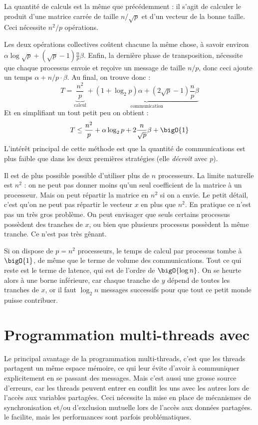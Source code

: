La quantité de calculs est la même que précédemment : il s'agit de calculer le
produit d'une matrice carrée de taille $n/\sqrt{p}$ et d'un vecteur de la bonne
taille. Ceci nécessite $n^2/p$ opérations.

Les deux opérations collectives coûtent chacune la même chose, à savoir environ
$\alpha \log \sqrt{p} + (\sqrt{p}-1) \frac{n}{p} \beta $. Enfin, la
dernière phase de \og transposition\fg, nécessite que chaque processus envoie et
reçoive un message de taille $n/p$, donc ceci ajoute un temps
$\alpha + n/p \cdot \beta$. Au final, on trouve donc :
\[
T= \underbrace{\frac{n^2}{p}}_{\text{calcul}}
+ \underbrace{
  \left(1 + \log_2 p\right)  \alpha
  + \left(2 \sqrt{p} -1 \right) \frac{n}{p} \beta
}_{\text{communication}}
\]
Et en simplifiant un tout petit peu on obtient :
\[
T\leq  \frac{n^2}{p} + \alpha \log_2 p + 2 \frac{n}{\sqrt{p}} \beta + \bigO{1}
\]
L'intérêt principal de cette méthode est que la quantité de
communications est plus faible que dans les deux premières stratégies
(elle \emph{décroît} avec $p$).

Il est de plus possible possible d'utiliser plus de $n$ processeurs. La limite
naturelle est $n^2$ : on ne peut pas donner moins qu'un seul coefficient de la
matrice à un processeur. Mais on peut répartir la matrice en $n^2$ si on a
envie. Le petit détail, c'est qu'on ne peut pas répartir le vecteur $x$ en plus
que $n^2$. En pratique ce n'est pas un très gros problème. On peut envisager que
seuls certains processus possèdent des tranches de $x$, ou bien que plusieurs
processus possèdent la même tranche. Ce n'est pas très gênant.

Si on dispose de $p = n^2$ processeurs, le temps de calcul par processus tombe à
$\bigO{1}$, de même que le terme de volume des communications. Tout ce qui reste
est le terme de latence, qui est de l'ordre de $\bigO{\log n}$. On se heurte
alors à une borne inférieure, car chaque tranche de $y$ dépend de toutes les
tranches de $x$, or il faut $\log_2 n$ messages successifs pour que tout ce
petit monde puisse contribuer.

%


\chapter{Programmation multi-threads avec \OMP}
\label{chap:omp}

Le principal avantage de la programmation multi-threads, c'est que les threads
partagent un même espace mémoire, ce qui leur évite d'avoir à communiquer
explicitement en se passant des messages. Mais c'est aussi une grosse source
d'erreurs, car les threads peuvent entrer en conflit les uns avec les autres
lors de l'accès aux variables partagées. Ceci nécessite la mise en place de
mécanismes de synchronisation et/ou d'exclusion mutuelle lors de l'accès aux
données partagées. \OMP le facilite, mais les performances sont parfois
problématiques.

